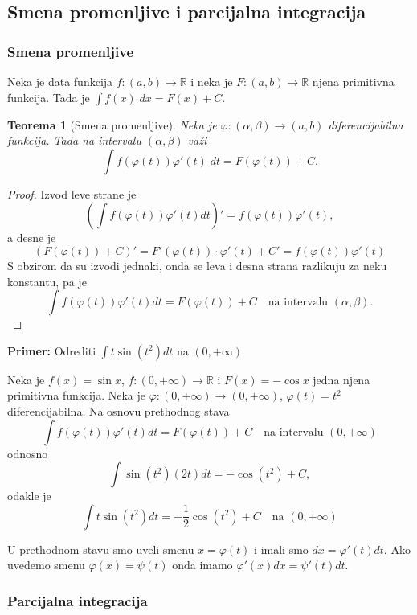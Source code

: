 \documentclass[a4paper,12pt,twoside]{report}
\newtheorem{theorem}{Teorema}[section]
\numberwithin{algorithm}{section}
\begin{document}
\subsection{Smena promenljive i parcijalna integracija}
\subsubsection{Smena promenljive}
Neka je data funkcija $f:(a, b) \to \mathbb{R}$ i neka je $F:(a, b) \to \mathbb{R}$ njena primitivna funkcija. Tada je 
$\int f(x)\;dx = F(x) + C$.

\begin{theorem}[Smena promenljive]
    Neka je $\varphi:(\alpha, \beta) \to (a, b)$ diferencijabilna funkcija. Tada na intervalu $(\alpha, \beta)$ važi 
    \[ \int f(\varphi(t))\varphi'(t) \; dt = F(\varphi(t)) + C. \]
\end{theorem}

\begin{proof}
    Izvod leve strane je
    \[
        \left(\int f(\varphi(t))\varphi'(t)dt\right)' = f(\varphi(t))\varphi'(t),
    \]
    a desne je
    \[
        (F(\varphi(t)) + C)' = F'(\varphi(t)) \cdot \varphi'(t) + C' = f(\varphi(t))\varphi'(t)
    \]
    S obzirom da su izvodi jednaki, onda se leva i desna strana razlikuju za neku konstantu, pa je
    \[
        \int f(\varphi(t))\varphi'(t)dt = F(\varphi(t)) + C \quad \text{na intervalu } (\alpha, \beta).
    \]
\end{proof}

\noindent \textbf{Primer:} Odrediti \(\int t \sin(t^2)dt\) na \((0, +\infty)\)

Neka je \(f(x) = \sin x\), \(f: (0, +\infty) \to \mathbb{R}\) i \(F(x) = -\cos x\) jedna njena primitivna funkcija.
Neka je \(\varphi: (0, +\infty) \to (0, +\infty)\), \(\varphi(t) = t^2\) diferencijabilna.
Na osnovu prethodnog stava
\[
    \int f(\varphi(t))\varphi'(t)dt = F(\varphi(t)) + C \quad \text{na intervalu } (0, +\infty)
\]
odnosno
\[
    \int \sin(t^2)(2t)dt = -\cos(t^2) + C,
\]
odakle je
\[
    \int t \sin(t^2)dt = -\frac{1}{2}\cos(t^2) + C \quad \text{na } (0, +\infty)
\]

U prethodnom stavu smo uveli smenu \(x = \varphi(t)\) i imali smo \(dx = \varphi'(t)dt\). Ako uvedemo smenu \(\varphi(x) = \psi(t)\) onda imamo \(\varphi'(x)dx = \psi'(t)dt\).


\subsubsection{Parcijalna integracija}
\end{document}
